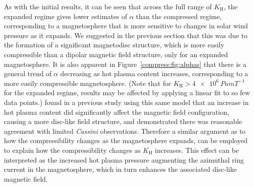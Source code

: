 As with the initial results, it can be seen that across the full range of $K_\mathrm{H}$, the expanded regime gives lower estimates of $\alpha$ than the compressed regime, corresponding to a magnetosphere that is more sensitive to changes in solar wind pressure as it expands. We suggested in the previous section that this was due to the formation of a significant magnetodisc structure, which is more easily compressible than a dipolar magnetic field structure, only for an expanded magnetosphere. It is also apparent in Figure~\ref{compress:fig:alphas} that there is a general trend of $\alpha$ decreasing as hot plasma content increases, corresponding to a more easily compressible magnetosphere. (Note that for $K_\mathrm{H} > \SI{4e6}{Pa m T^{-1}}$ for the expanded regime, results may be affected by applying a linear fit to so few data points.) \citet{achilleos2010b} found in a previous study using this same model that an increase in hot plasma content did significantly affect the magnetic field configuration, causing a more disc-like field structure, and demonstrated there was reasonable agreement with limited \textit{Cassini} observations. Therefore a similar argument as to how the compressibility changes as the magnetosphere expands, can be employed to explain how the compressibility changes as $K_\mathrm{H}$ increases. This effect can be interpreted as the increased hot plasma pressure augmenting the azimuthal ring current in the magnetosphere, which in turn enhances the associated disc-like magnetic field.

